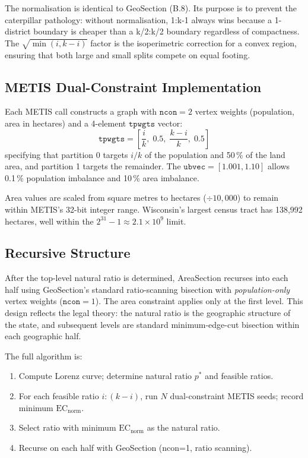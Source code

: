 The normalisation is identical to GeoSection (B.8).
Its purpose is to prevent the caterpillar pathology: without normalisation,
1:k-1 always wins because a 1-district boundary is cheaper than a k/2:k/2
boundary regardless of compactness.
The $\sqrt{\min(i,k-i)}$ factor is the isoperimetric correction for a convex
region, ensuring that both large and small splits compete on equal footing.

\subsection{METIS Dual-Constraint Implementation}

Each METIS call constructs a graph with $\mathtt{ncon}=2$ vertex weights
(population, area in hectares) and a 4-element $\mathtt{tpwgts}$ vector:
\[
  \mathtt{tpwgts} = \left[\frac{i}{k},\; 0.5,\; \frac{k-i}{k},\; 0.5\right]
\]
specifying that partition 0 targets $i/k$ of the population and 50\,\% of
the land area, and partition 1 targets the remainder.
The $\mathtt{ubvec} = [1.001, 1.10]$ allows 0.1\,\% population imbalance and
10\,\% area imbalance.

Area values are scaled from square metres to hectares ($\div 10{,}000$) to
remain within METIS's 32-bit integer range.
Wisconsin's largest census tract has 138{,}992 hectares, well within the
$2^{31} - 1 \approx 2.1 \times 10^9$ limit.

\subsection{Recursive Structure}

After the top-level natural ratio is determined, AreaSection recurses into
each half using GeoSection's standard ratio-scanning bisection with
\emph{population-only} vertex weights ($\mathtt{ncon}=1$).
The area constraint applies only at the first level.
This design reflects the legal theory: the natural ratio is the geographic
structure of the state, and subsequent levels are standard minimum-edge-cut
bisection within each geographic half.

The full algorithm is:
\begin{enumerate}
  \item Compute Lorenz curve; determine natural ratio $p^*$ and feasible ratios.
  \item For each feasible ratio $i:(k-i)$, run $N$ dual-constraint METIS seeds;
    record minimum $\mathrm{EC}_{\text{norm}}$.
  \item Select ratio with minimum $\mathrm{EC}_{\text{norm}}$ as the natural ratio.
  \item Recurse on each half with GeoSection (ncon=1, ratio scanning).
\end{enumerate}

